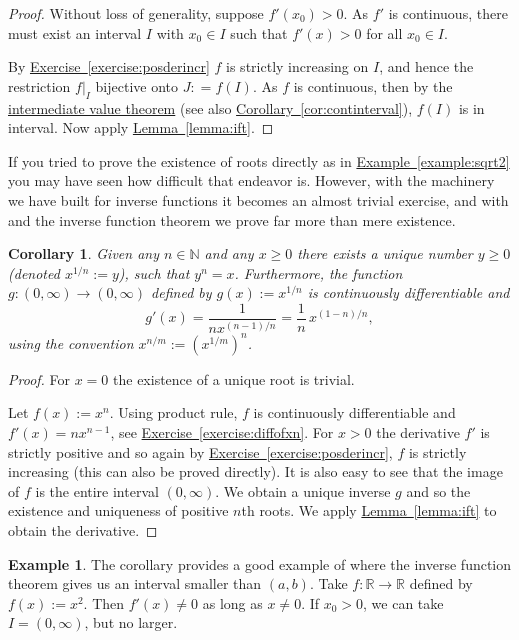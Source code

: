 \documentclass[12pt]{book}
\newcommand{\R}{{\mathbb{R}}}
\newcommand{\N}{{\mathbb{N}}}
\theoremstyle{plain}
\newtheorem{cor}[thm]{Corollary}
\theoremstyle{remark}
\theoremstyle{definition}
\theoremstyle{exercise}
\theoremstyle{example}
\newtheorem{example}[thm]{Example}
\newcommand{\exerciseref}[1]{\hyperref[#1]{Exercise~\ref*{#1}}}
\newcommand{\exampleref}[1]{\hyperref[#1]{Example~\ref*{#1}}}
\newcommand{\lemmaref}[1]{\hyperref[#1]{Lemma~\ref*{#1}}}
\newcommand{\corref}[1]{\hyperref[#1]{Corollary~\ref*{#1}}}
\begin{document}
\begin{proof}
Without loss of generality, suppose $f'(x_0) > 0$.  As $f'$ is
continuous, there must exist an interval $I$ with $x_0 \in I$
such that $f'(x) > 0$ for all $x_0 \in I$.

By \exerciseref{exercise:posderincr} $f$ is strictly increasing
on $I$, and hence the restriction $f|_{I}$ bijective onto $J: = f(I)$.
As $f$ is continuous, then by the
\hyperref[IVT:thm]{intermediate value theorem}
(see also \corref{cor:continterval}), $f(I)$ is in interval.
Now apply \lemmaref{lemma:ift}.
\end{proof}

If you tried to prove the existence of roots directly as in
\exampleref{example:sqrt2} you may have seen
how difficult that endeavor is.  However, with the machinery we have built
for inverse functions it becomes
an almost trivial exercise, and with and the inverse function theorem
we prove far more than mere existence.

\begin{cor}
Given any $n \in \N$ and any $x \geq 0$ there exists a unique 
number $y \geq 0$ (denoted $x^{1/n} := y$), such that $y^n = x$.  Furthermore,
the function $g \colon (0,\infty) \to (0,\infty)$ defined by
$g(x) := x^{1/n}$ is continuously differentiable and
\begin{equation*}
g'(x) = \frac{1}{nx^{(n-1)/n}} = \frac{1}{n} \, x^{(1-n)/n} ,
\end{equation*}
using the convention $x^{n/m} := {(x^{1/m})}^{n}$.
\end{cor}

\begin{proof}
For $x=0$ the existence of a unique root is trivial.

Let $f(x) := x^n$.  Using product rule, $f$ is continuously differentiable
and $f'(x) = nx^{n-1}$, see \exerciseref{exercise:diffofxn}.  For $x > 0$ the derivative $f'$ is strictly positive
and so again by \exerciseref{exercise:posderincr}, $f$ is strictly
increasing (this can also be proved directly).  It is also easy to
see that the image of $f$ is the entire interval $(0,\infty)$.  We 
obtain a unique inverse $g$ and so the existence and uniqueness of positive
$n$th roots.  We apply \lemmaref{lemma:ift} to obtain the derivative.
\end{proof}

\begin{example}
The corollary provides a good example of where the inverse function theorem
gives us an interval smaller than $(a,b)$.  Take $f \colon \R \to \R$
defined by $f(x) := x^2$.  Then $f'(x) \not= 0$
as long as $x \not= 0$.  If $x_0 > 0$, we can take $I=(0,\infty)$, but
no larger.
\end{example}
\end{document}

